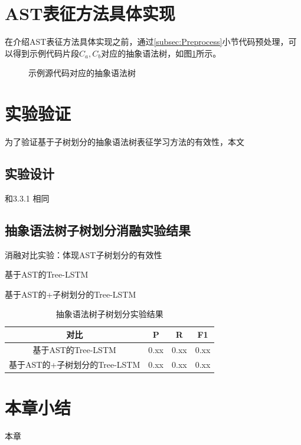 \section{AST表征方法具体实现}
\label{sec:achieve}

在介绍AST表征方法具体实现之前，通过\ref{subsec:Preprocess}小节代码预处理，可以得到示例代码片段$C_{a},C_{b}$对应的抽象语法树，如图\ref{fig:astcode}所示。
\begin{figure}[htbp]
  \centering  %
  \qquad
  \caption{示例源代码对应的抽象语法树}    %
  \label{fig:astcode}    %
\end{figure}

\section{实验验证}
为了验证基于子树划分的抽象语法树表征学习方法的有效性，本文
\subsection{实验设计}
和3.3.1 相同
\subsection{抽象语法树子树划分消融实验结果}
消融对比实验：体现AST子树划分的有效性

基于AST的Tree-LSTM

基于AST的+子树划分的Tree-LSTM

\begin{table}
  \centering
  \caption{抽象语法树子树划分实验结果} %
  \begin{tabular*}{0.9\textwidth}{@{\extracolsep{\fill}}cccc}
  \toprule
    对比			&P		&R		&F1 \\
  \midrule
    基于AST的Tree-LSTM			&0.xx	&0.xx		&0.xx \\
    基于AST的+子树划分的Tree-LSTM			&0.xx		&0.xx		&0.xx \\
  \bottomrule
  \end{tabular*}
\end{table}

\section{本章小结}
本章



